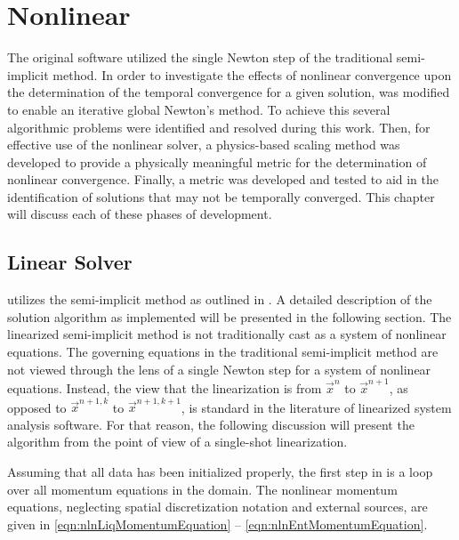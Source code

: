 \chapter{Nonlinear \cobra{}}
\label{chap:nln_solver}
The original \cobra{} software utilized the single Newton step of the traditional semi-implicit method.
In order to investigate the effects of nonlinear convergence upon the determination of the temporal convergence for a given solution, \cobra{} was modified to enable an iterative global Newton's method.
To achieve this several algorithmic problems were identified and resolved during this work.
Then, for effective use of the nonlinear solver, a physics-based scaling method was developed to provide a physically meaningful metric for the determination of nonlinear convergence.
Finally, a metric was developed and tested to aid in the identification of solutions that may not be temporally converged.
This chapter will discuss each of these phases of development.

\section{Linear Solver}
\label{sect:linCobraAlg}

\cobra{} utilizes the semi-implicit method as outlined in .
A detailed description of the solution algorithm as implemented will be presented in the following section.
The linearized semi-implicit method is not traditionally cast as a system of nonlinear equations.
The governing equations in the traditional semi-implicit method are not viewed through the lens of a single Newton step for a system of nonlinear equations.
Instead, the view that the linearization is from $\vec{x}^{n}$ to $\vec{x}^{n+1}$, as opposed to $\vec{x}^{n+1, k}$ to $\vec{x}^{n+1, k+1}$, is standard in the literature of linearized system analysis software.
For that reason, the following discussion will present the algorithm from the point of view of a single-shot linearization.

Assuming that all data has been initialized properly, the first step in \cobra{} is a loop over all momentum equations in the domain.
The nonlinear momentum equations, neglecting spatial discretization notation and external sources, are given in \eqref{eqn:nlnLiqMomentumEquation} -- \eqref{eqn:nlnEntMomentumEquation}.

